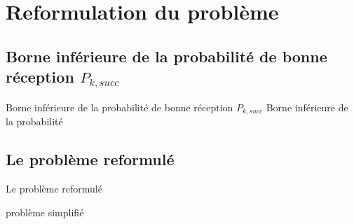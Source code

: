 \section{Reformulation du problème}
\subsection{Borne inférieure de la probabilité de bonne réception $P_{k,succ}$}
\begin{frame}{Borne inférieure de la probabilité de bonne réception $P_{k,succ}$}
Borne inférieure de la probabilité
 
\end{frame}


\subsection{Le problème reformulé}
\begin{frame}{Le problème reformulé}

problème simplifié
\end{frame}

%
